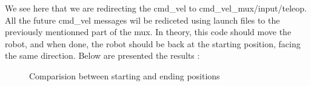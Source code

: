 \documentclass[aps,letterpaper,11pt]{revtex4}
\begin{document}
We see here that we are redirecting the cmd\_vel to cmd\_vel\_mux/input/teleop. All the future cmd\_vel messages wil be rediceted using launch files to the previously mentionned part of the mux.
In theory, this code should move the robot, and when done, the robot should be back at the starting position, facing the same direction. Below are presented the results : 
\begin{figure}[H]
    \centering
    \qquad
    \caption{Comparision between starting and ending positions}
    \label{fig:example}%
\end{figure}
\end{document}
